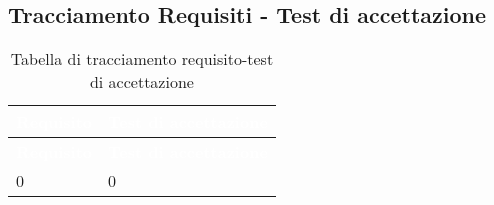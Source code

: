 \subsection{Tracciamento Requisiti - Test di accettazione}
{
\renewcommand{\arraystretch}{1.5}
\centering
\begin{longtable}{C{4cm} C{4cm}}
\caption{Tabella di tracciamento requisito-test di accettazione}\\
\textcolor{white}{\textbf{Requisito}} & \textcolor{white}{\textbf{Test di accettazione}}\\	
\endfirsthead
{}
\textcolor{white}{\textbf{Requisito}} & \textcolor{white}{\textbf{Test di accettazione}}\\	
\endhead

0 & 0  \\

\end{longtable}
}
